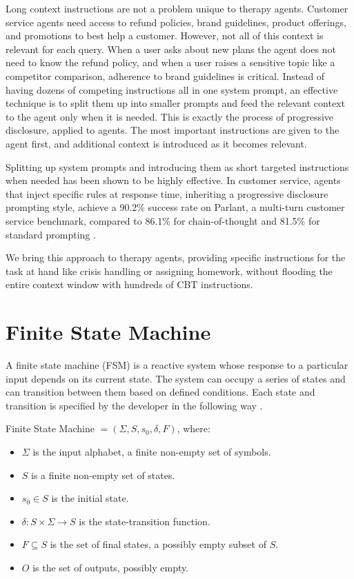 \documentclass[twoside]{report}
\begin{document}
Long context instructions are not a problem unique to therapy agents. Customer service agents need access to refund policies, brand guidelines, product offerings, and promotions to best help a customer. However, not all of this context is relevant for each query. When a user asks about new plans the agent does not need to know the refund policy, and when a user raises a sensitive topic like a competitor comparison, adherence to brand guidelines is critical. Instead of having dozens of competing instructions all in one system prompt, an effective technique is to split them up into smaller prompts and feed the relevant context to the agent only when it is needed. This is exactly the process of progressive disclosure, applied to agents. The most important instructions are given to the agent first, and additional context is introduced as it becomes relevant.

Splitting up system prompts and introducing them as short targeted instructions when needed has been shown to be highly effective. In customer service, agents that inject specific rules at response time, inheriting a progressive disclosure prompting style, achieve a 90.2\% success rate on Parlant, a multi-turn customer service benchmark, compared to 86.1\% for chain-of-thought and 81.5\% for standard prompting \cite{karov2025arq}.

We bring this approach to therapy agents, providing specific instructions for the task at hand like crisis handling or assigning homework, without flooding the entire context window with hundreds of CBT instructions.

\section{Finite State Machine}
A finite state machine (FSM) is a reactive system whose response to a particular input depends on its current state. The system can occupy a series of states and can transition between them based on defined conditions. Each state and transition is specified by the developer in the following way \cite{hopcroft2006automata}.

Finite State Machine $=(\Sigma, S, s_0, \delta, F)$, where:
\begin{itemize}
    \item $\Sigma$ is the input alphabet, a finite non-empty set of symbols.
    \item $S$ is a finite non-empty set of states.
    \item $s_0 \in S$ is the initial state.
    \item $\delta : S \times \Sigma \rightarrow S$ is the state-transition function.
    \item $F \subseteq S$ is the set of final states, a possibly empty subset of $S$.
    \item $O$ is the set of outputs, possibly empty.
\end{itemize}
\end{document}
